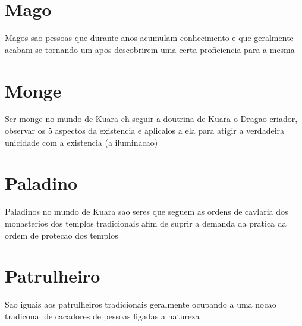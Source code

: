 \documentclass{book}
\begin{document}
\section{Mago}
Magos sao pessoas que durante anos acumulam conhecimento e que geralmente acabam se tornando 
um apos descobrirem uma certa proficiencia para a mesma 
\section{Monge}
Ser monge no mundo de Kuara eh seguir a doutrina de Kuara o Dragao criador, observar os 5 
aspectos da existencia e aplicalos a ela para atigir a verdadeira unicidade com a existencia
(a iluminacao)
\section{Paladino}
Paladinos no mundo de Kuara sao seres que seguem as ordens de cavlaria dos monasterios dos 
templos tradicionais afim de suprir a demanda da pratica da ordem de protecao dos templos 
\section{Patrulheiro}
Sao iguais aos patrulheiros tradicionais geralmente ocupando a uma nocao tradiconal de 
cacadores de pessoas ligadas a natureza 
\end{document}
